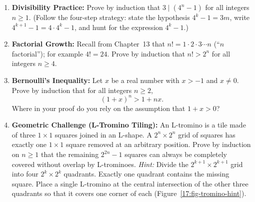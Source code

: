 \begin{enumerate}
\item \textbf{Divisibility Practice:} Prove by induction that $3 \mid (4^n - 1)$ for all integers $n \ge 1$. (Follow the four-step strategy: state the hypothesis $4^k - 1 = 3m$, write $4^{k+1} - 1 = 4 \cdot 4^k - 1$, and hunt for the expression $4^k - 1$.)

\item \textbf{Factorial Growth:} Recall from Chapter~13 that $n! = 1 \cdot 2 \cdot 3 \cdots n$ (``$n$ factorial''); for example $4! = 24$. Prove by induction that $n! > 2^n$ for all integers $n \ge 4$.

\item \textbf{Bernoulli's Inequality:} Let $x$ be a real number with $x > -1$ and $x \neq 0$. Prove by induction that for all integers $n \ge 2$,
\[
(1 + x)^n > 1 + nx.
\]
Where in your proof do you rely on the assumption that $1 + x > 0$?

\item \textbf{Geometric Challenge (L-Tromino Tiling):} An L-tromino is a tile made of three $1 \times 1$ squares joined in an L-shape. A $2^n \times 2^n$ grid of squares has exactly one $1 \times 1$ square removed at an arbitrary position. Prove by induction on $n \ge 1$ that the remaining $2^{2n} - 1$ squares can always be completely covered without overlap by L-trominoes.
\emph{Hint:} Divide the $2^{k+1} \times 2^{k+1}$ grid into four $2^k \times 2^k$ quadrants. Exactly one quadrant contains the missing square. Place a single L-tromino at the central intersection of the other three quadrants so that it covers one corner of each (Figure~\ref{17:fig-tromino-hint}).
\end{enumerate}

